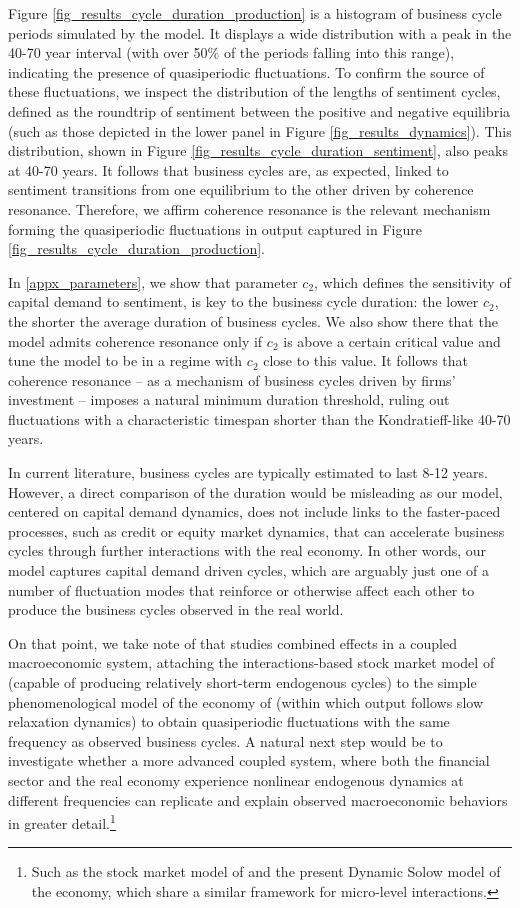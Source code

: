 \documentclass[authoryear, review]{elsarticle}
\begin{document}
Figure \ref{fig_results_cycle_duration_production} is a histogram of business cycle periods simulated by the model. It displays a wide distribution with a peak in the 40-70 year interval (with over 50\% of the periods falling into this range), indicating the presence of quasiperiodic fluctuations. To confirm the source of these fluctuations, we inspect the distribution of the lengths of sentiment cycles, defined as the roundtrip of sentiment between the positive and negative equilibria (such as those depicted in the lower panel in Figure \ref{fig_results_dynamics}). This distribution, shown in Figure \ref{fig_results_cycle_duration_sentiment}, also peaks at 40-70 years. It follows that business cycles are, as expected, linked to sentiment transitions from one equilibrium to the other driven by coherence resonance. Therefore, we affirm coherence resonance is the relevant mechanism forming the quasiperiodic fluctuations in output captured in Figure \ref{fig_results_cycle_duration_production}.       

In \ref{appx_parameters}, we show that parameter $c_2$, which defines the sensitivity of capital demand to sentiment, is key to the business cycle duration: the lower $c_2$, the shorter the average duration of business cycles. We also show there that the model admits coherence resonance only if $c_2$ is above a certain critical value and tune the model to be in a regime with $c_2$ close to this value. It follows that coherence resonance -- as a mechanism of business cycles driven by firms' investment -- imposes a natural minimum duration threshold, ruling out fluctuations with a characteristic timespan shorter than the Kondratieff-like 40-70 years.

In current literature, business cycles are typically estimated to last 8-12 years. However, a direct comparison of the duration would be misleading as our model, centered on capital demand dynamics, does not include links to the faster-paced processes, such as credit or equity market dynamics, that can accelerate business cycles through further interactions with the real economy. In other words, our model captures capital demand driven cycles, which are arguably just one of a number of fluctuation modes that reinforce or otherwise affect each other to produce the business cycles observed in the real world.

On that point, we take note of \citet{KroujilineEtAl2019} that studies combined effects in a coupled macroeconomic system, attaching the interactions-based stock market model of \citet{GusevEtAl2015} (capable of producing relatively short-term endogenous cycles) to the simple phenomenological model of the economy of \citet{Blanchard1981} (within which output follows slow relaxation dynamics) to obtain quasiperiodic fluctuations with the same frequency as observed business cycles. A natural next step would be to investigate whether a more advanced coupled system, where both the financial sector and the real economy experience nonlinear endogenous dynamics at different frequencies
can replicate and explain observed macroeconomic behaviors in greater detail.\footnote{Such as the stock market model of \citet{GusevEtAl2015} and the present Dynamic Solow model of the economy, which share a similar framework for micro-level interactions.}
\end{document}
